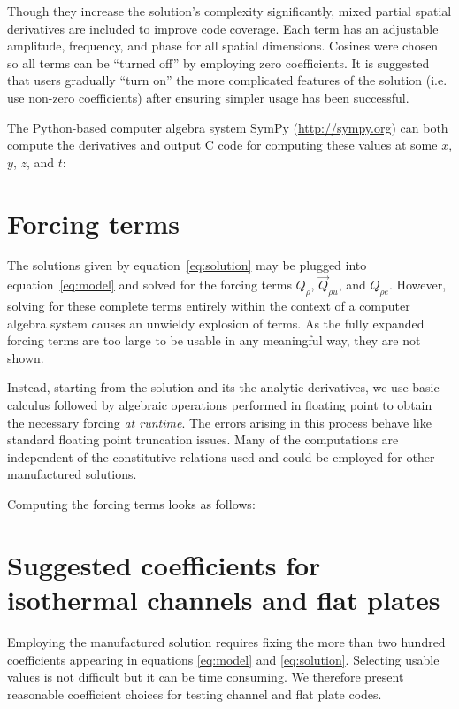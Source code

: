 \documentclass[10pt,reqno]{amsart}
\begin{document}
Though they increase the solution's complexity significantly, mixed partial
spatial derivatives are included to improve code coverage.  Each term has an
adjustable amplitude, frequency, and phase for all spatial dimensions.  Cosines
were chosen so all terms can be ``turned off'' by employing zero coefficients.
It is suggested that users gradually ``turn on'' the more complicated features
of the solution (i.e. use non-zero coefficients) after ensuring simpler usage
has been successful.

The Python-based computer algebra system SymPy (\url{http://sympy.org})
can both compute the derivatives and output C code for computing these
values at some $x$, $y$, $z$, and $t$:


\section{Forcing terms}
\label{sec:forcing}

The solutions given by equation~\eqref{eq:solution} may be plugged into
equation~\eqref{eq:model} and solved for the forcing terms $Q_{\rho}$,
$\vec{Q}_{\rho{}u}$, and $Q_{\rho{}e}$.  However, solving for these complete
terms entirely within the context of a computer algebra system causes an
unwieldy explosion of terms.  As the fully expanded forcing terms are too
large to be usable in any meaningful way, they are not shown.

Instead, starting from the solution and its the analytic derivatives, we use
basic calculus followed by algebraic operations performed in floating point to
obtain the necessary forcing \emph{at runtime}.  The errors arising in this
process behave like standard floating point truncation issues.  Many of the
computations are independent of the constitutive relations used and could be
employed for other manufactured solutions.

Computing the forcing terms looks as follows:


\section{Suggested coefficients for isothermal channels and flat plates}
\label{sec:suggest}

Employing the manufactured solution requires fixing the more than two hundred
coefficients appearing in equations \eqref{eq:model} and \eqref{eq:solution}.
Selecting usable values is not difficult but it can be time consuming.  We
therefore present reasonable coefficient choices for testing channel and flat
plate codes.
\end{document}
